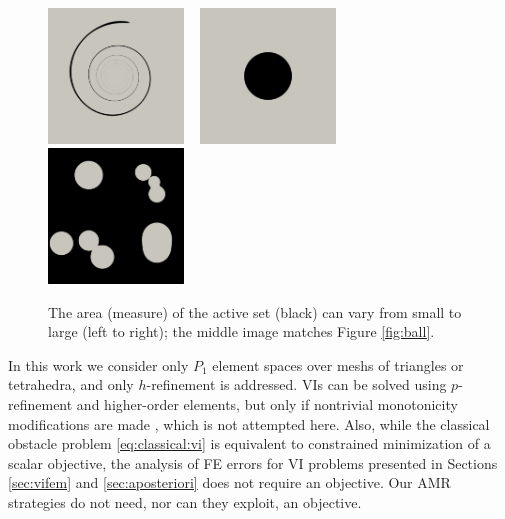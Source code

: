 \documentclass[]{interact}
\theoremstyle{plain}%
\theoremstyle{definition}
\theoremstyle{remark}
\begin{document}
\begin{figure}[ht]
\noindent \hspace{-1mm} \mbox{\includegraphics[width=0.32\textwidth]{static/spiral.png} \, \includegraphics[width=0.32\textwidth]{static/sphere.png} \, \includegraphics[width=0.32\textwidth]{static/blisters.png}}
\caption{The area (measure) of the active set (black) can vary from small to large (left to right); the middle image matches Figure \ref{fig:ball}.}
\label{fig:activesizes}
\end{figure}

In this work we consider only $P_1$ element spaces over meshs of triangles or tetrahedra, and only $h$-refinement is addressed.  VIs can be solved using $p$-refinement and higher-order elements, but only if nontrivial monotonicity modifications are made \cite{KeithSurowiec2024}, which is not attempted here.  Also, while the classical obstacle problem \eqref{eq:classical:vi} is equivalent to constrained minimization of a scalar objective, the analysis of FE errors for VI problems presented in Sections \ref{sec:vifem} and \ref{sec:aposteriori} does not require an objective.  Our AMR strategies do not need, nor can they exploit, an objective.
\end{document}
